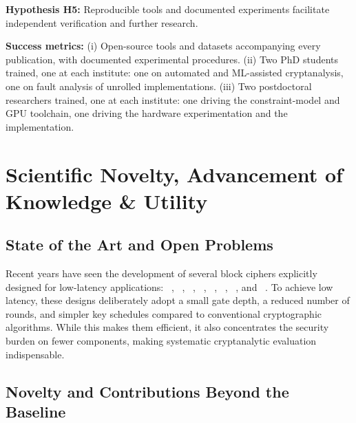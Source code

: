 \textbf{Hypothesis H5:}
Reproducible tools and documented experiments facilitate
independent verification and further research.

\textbf{Success metrics:}
(i) Open-source tools and datasets accompanying every publication, with documented experimental procedures.
(ii) Two PhD students trained, one at each institute: one on automated and ML-assisted cryptanalysis, one on fault analysis of unrolled implementations.
(iii) Two postdoctoral researchers trained, one at each institute: one driving the constraint-model and GPU toolchain, one driving the hardware experimentation and the  implementation.
\section{Scientific Novelty, Advancement of Knowledge \& Utility}


\subsection{State of the Art and Open Problems}

Recent years have seen the development of several block ciphers explicitly designed for low-latency applications:
~\cite{DBLP:conf/asiacrypt/BorghoffCGKKKLNPRRTY12},
~\cite{DBLP:conf/sacrypt/BozilovEKLLMNRT20},
~\cite{DBLP:conf/crypto/BeierleJKL0PSSS16},
~\cite{DBLP:journals/tosc/Avanzi17},
~\cite{DBLP:journals/tosc/AvanziBDEGNR23},
~\cite{DBLP:conf/eurocrypt/BelkheyarDGLMPRSSAV25},
~\cite{DBLP:conf/uss/CanaleGLTTU23}, and
~\cite{cryptoeprint:2024/1240}.
To achieve low latency, these designs deliberately adopt a small gate depth, a reduced number of rounds, and simpler key schedules compared to conventional cryptographic algorithms.
While this makes them efficient, it also concentrates the security burden on fewer components, making systematic cryptanalytic evaluation indispensable.

\subsection{Novelty and Contributions Beyond the Baseline}

